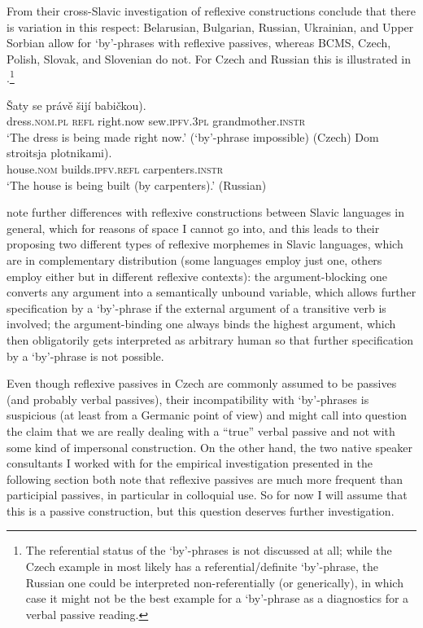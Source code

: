 \documentclass[output=paper,colorlinks,citecolor=brown]{langscibook}
\begin{document}
\noindent From their cross-Slavic investigation of reflexive constructions \citet{fehrmann+10} conclude that there is variation in this respect: Belarusian, Bulgarian, Russian, Ukrainian, and Upper Sorbian allow for `by'-phrases with reflexive passives, whereas BCMS, Czech, Polish, Slovak, and Slovenian do not. For Czech and Russian this is illustrated in  \citep[adapted from][210f.]{fehrmann+10}.\footnote{The referential status of the `by'-phrases is not discussed at all; while the Czech example in  most likely has a referential/definite `by'-phrase, the Russian one could be interpreted non-referentially (or generically), in which case it might not be the best example for a `by'-phrase as a diagnostics for a verbal passive reading.}

\ea \label{ex:fehrmby}
\ea
\gll Šaty se právě šijí \minsp{(*} babičkou).\\
	dress.\textsc{nom.pl} \textsc{refl} right.now sew.\textsc{ipfv.3pl} {} grandmother.\textsc{instr}\\
\glt	`The dress is being made right now.' (`by'-phrase impossible) \hfill (Czech)
\ex
\gll Dom stroitsja \minsp{(} plotnikami).\\
	house.\textsc{nom} builds.\textsc{ipfv.refl} {} carpenters.\textsc{instr}\\
\glt	`The house is being built (by carpenters).' \hfill (Russian)
\z 
\z 

\noindent \citet{fehrmann+10} note further differences with reflexive constructions between Slavic languages in general, which for reasons of space I cannot go into, and this leads to their proposing two different types of reflexive morphemes in Slavic languages, which are in complementary distribution (some languages employ just one, others employ either but in different reflexive contexts): the argument-blocking one converts any argument into a semantically unbound variable, which allows further specification by a `by'-phrase if the external argument of a transitive verb is involved; the argument-binding one always binds the highest argument, which then obligatorily gets interpreted as arbitrary human so that further specification by a `by'-phrase is not possible. 

Even though reflexive passives in Czech are commonly assumed to be passives (and probably verbal passives), their incompatibility with `by'-phrases is suspicious (at least from a Germanic point of view) and might call into question the claim that we are really dealing with a ``true'' verbal passive and not with some kind of impersonal construction. On the other hand, the two native speaker consultants I worked with for the empirical investigation presented in the following section both note that reflexive passives are much more frequent than participial passives, in particular in colloquial use. %
So for now I will assume that this is a passive construction, but this question deserves further investigation. 
\end{document}

